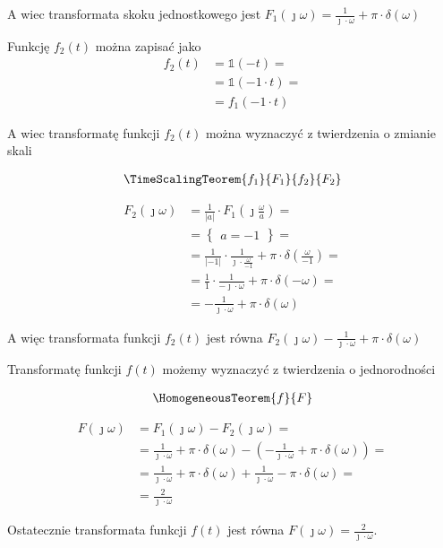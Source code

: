 \begin{task}
A wiec transformata skoku jednostkowego jest $F_1(\jmath \omega)=\frac{1}{\jmath \cdot \omega } + \pi \cdot \delta(\omega)$

Funkcję $f_2(t)$ można zapisać jako
\begin{align*}
f_2(t)&=\mathbb{1}(-t)=\\
&=\mathbb{1}(-1 \cdot t)=\\
&=f_1(-1 \cdot t)
\end{align*}

A wiec transformatę funkcji $f_2(t)$ można wyznaczyć z twierdzenia o zmianie skali

\begin{align*}
\TimeScalingTeorem{f_1}{F_1}{f_2}{F_2}
\end{align*}

\begin{align*}
F_2(\jmath \omega)&=\frac{1}{\left| a \right|} \cdot F_1(\jmath \frac{\omega}{a})=\\
&=\begin{Bmatrix}
a=-1
\end{Bmatrix}=\\
&=\frac{1}{\left| -1 \right|} \cdot \frac{1}{\jmath \cdot \frac{\omega}{-1} } + \pi \cdot \delta(\frac{\omega}{-1})=\\
&=\frac{1}{1} \cdot \frac{1}{-\jmath \cdot \omega } + \pi \cdot \delta(-\omega)=\\
&=- \frac{1}{\jmath \cdot \omega } + \pi \cdot \delta(\omega)
\end{align*}

A więc transformata funkcji $f_2(t)$ jest równa $F_2(\jmath \omega)- \frac{1}{\jmath \cdot \omega } + \pi \cdot \delta(\omega)$

Transformatę funkcji $f(t)$ możemy wyznaczyć z twierdzenia o jednorodności 

\begin{align*}
\HomogeneousTeorem{f}{F}
\end{align*}


\begin{align*}
F(\jmath \omega)&=F_1(\jmath \omega) - F_2(\jmath \omega)=\\
&=\frac{1}{\jmath \cdot \omega } + \pi \cdot \delta(\omega) - \left(-\frac{1}{\jmath \cdot \omega } + \pi \cdot \delta(\omega)\right)=\\
&=\frac{1}{\jmath \cdot \omega } + \pi \cdot \delta(\omega) +\frac{1}{\jmath \cdot \omega } - \pi \cdot \delta(\omega)=\\
&=\frac{2}{\jmath \cdot \omega }
\end{align*}

Ostatecznie transformata funkcji $f(t)$ jest równa $F(\jmath \omega)=\frac{2}{\jmath \cdot \omega }$.

\end{task}

